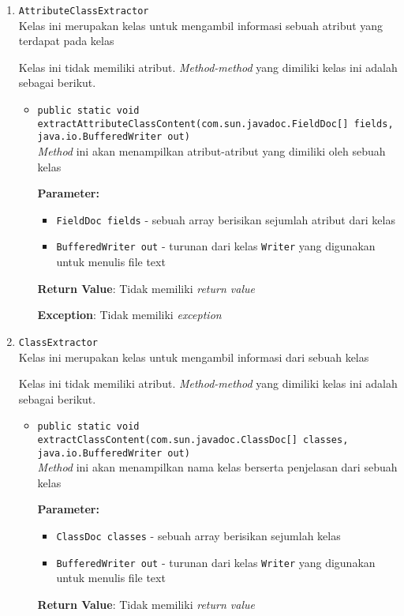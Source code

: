 \begin{enumerate}
\item \texttt{AttributeClassExtractor}\\Kelas ini merupakan kelas untuk mengambil informasi sebuah atribut yang
 terdapat pada kelas

Kelas ini tidak memiliki atribut. \textit{Method-method} yang dimiliki kelas ini adalah sebagai berikut.
\begin{itemize}
\item \texttt{public static void extractAttributeClassContent(com.sun.javadoc.FieldDoc[] fields, java.io.BufferedWriter out)}\\ 
\textit{Method} ini akan menampilkan atribut-atribut yang dimiliki oleh
 sebuah kelas

\textbf{Parameter:}
\begin{itemize}
\item \texttt{FieldDoc fields} - 
sebuah array berisikan sejumlah atribut dari kelas
\item \texttt{BufferedWriter out} - 
turunan dari kelas \texttt{Writer} yang digunakan untuk menulis
 file text
\end{itemize}
\textbf{Return Value}: Tidak memiliki \textit{return value}

\textbf{Exception}: Tidak memiliki \textit{exception}

\end{itemize}
\item \texttt{ClassExtractor}\\Kelas ini merupakan kelas untuk mengambil informasi dari sebuah kelas

Kelas ini tidak memiliki atribut. \textit{Method-method} yang dimiliki kelas ini adalah sebagai berikut.
\begin{itemize}
\item \texttt{public static void extractClassContent(com.sun.javadoc.ClassDoc[] classes, java.io.BufferedWriter out)}\\ 
\textit{Method} ini akan menampilkan nama kelas berserta penjelasan dari
 sebuah kelas

\textbf{Parameter:}
\begin{itemize}
\item \texttt{ClassDoc classes} - 
sebuah array berisikan sejumlah kelas
\item \texttt{BufferedWriter out} - 
turunan dari kelas \texttt{Writer} yang digunakan untuk menulis
                file text
\end{itemize}
\textbf{Return Value}: Tidak memiliki \textit{return value}


\end{itemize}
\end{enumerate}
